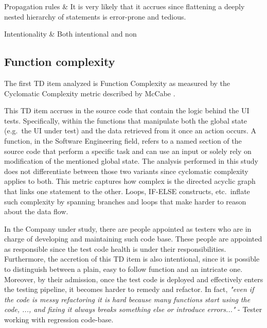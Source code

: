 \begin{table}[!htbp]
\begin{tabu}
			
			
			Propagation rules & It is very likely that it accrues since flattening a deeply nested hierarchy of statements is error-prone and tedious.\\
			\hline
			
			Intentionality & Both intentional and non \\
			\hline 	 	
			
		\end{tabu}
		\label{tab:res-function-complexity}
		\caption[Function complexity specification]{Function complexity specification according to guidelines specified by \cite{mapping_study_td}.}
	\end{table}

	\subsection{Function complexity}
	
	
	The first TD item analyzed is Function Complexity as measured by the Cyclomatic Complexity metric described by McCabe \cite{cyclomatic_complexity}.

    This TD item accrues in the source code that contain the logic behind the UI tests. Specifically, within the functions that manipulate both the global state (e.g.\ the UI under test) and the data retrieved from it once an action occurs. A function, in the Software Engineering field, refers to a named section of the source code that perform a specific task and can use an input or solely rely on modification of the mentioned global state. The analysis performed in this study does not differentiate between those two variants since cyclomatic complexity applies to both. This metric captures how complex is the directed acyclic graph that links one statement to the other. Loops, IF-ELSE constructs, etc.\ inflate such complexity by spanning branches and loops that make harder to reason about the data flow.
    
    In the Company under study, there are people appointed as testers who are in charge of developing and maintaining such code base. These people are appointed as responsible since the test code health is under their responsibilities. Furthermore, the accretion of this TD item is also intentional, since it is possible to distinguish between a plain, easy to follow function and an intricate one. Moreover, by their admission, once the test code is deployed and effectively enters the testing pipeline, it becomes harder to remedy and refactor. In fact, \textit{"even if the code is messy refactoring it is hard because many functions start using the code, ..., and fixing it always breaks something else or introduce errors..." } - Tester working with regression code-base.
    
